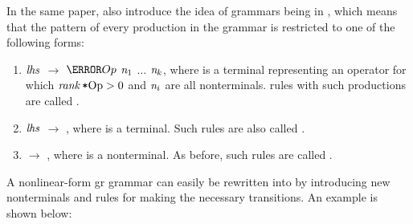 {In the same paper, \citeauthor{Balachandran1990} also introduce the idea of
\glspl{grammar} being in \emph{}, which means that the
pattern of every \gls{production} in the \gls{grammar} is restricted to one of
the following forms:%
%
\begin{enumerate}
  \item $\mNT{lhs}$ $\rightarrow$ $\mT{Op}$ $\mNT{n}[1]$ $\ldots$ $\mNT{n}[k]$,
    where  is a \gls{terminal} representing an operator for which
    \mbox{$\operatorname{\textrm{\textit{rank}}}{\text{\mbox{\ttfamily*}{Op}}} > 0$} and $\mNT{n}[i]$ are all
    \glspl{nonterminal}.
%
 \Glspl{rule} with such \glspl{production} are called
    \tbaseRules.
  \item $\mNT{lhs}$ $\rightarrow$ , where  is a terminal.
%
Such
    \glspl{rule} are also called \tbaseRules.
  \item {} $\rightarrow$ , where  is a
    \gls{nonterminal}.
%
As before, such \glspl{rule} are called \tchainRules.
\end{enumerate}
A non\gls{linear-form gr} \gls{grammar} can easily be rewritten
into  by introducing new
\glspl{nonterminal} and \glspl{rule} for making the necessary transitions.
%
An
example is shown below:

}
